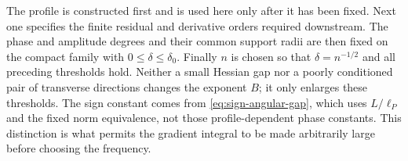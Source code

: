 \begin{remark}
\label{rem:wave-parameter-order}
The profile is constructed first and is used here only after it has
been fixed.  Next one specifies the finite residual and derivative
orders required downstream.  The phase and amplitude degrees and
their common support radii are then fixed on the compact family with
$0\le\delta\le\delta_0$.  Finally $n$ is chosen so that
$\delta=n^{-1/2}$ and all preceding thresholds hold.  Neither a small
Hessian gap nor a poorly conditioned pair of transverse directions
changes the exponent $B$; it only enlarges these thresholds.  The
sign constant comes from \eqref{eq:sign-angular-gap}, which
uses $L/\ell_P$ and the fixed norm equivalence, not those
profile-dependent phase constants.  This distinction is what permits
the gradient integral to be made arbitrarily large before choosing
the frequency.
\end{remark}
